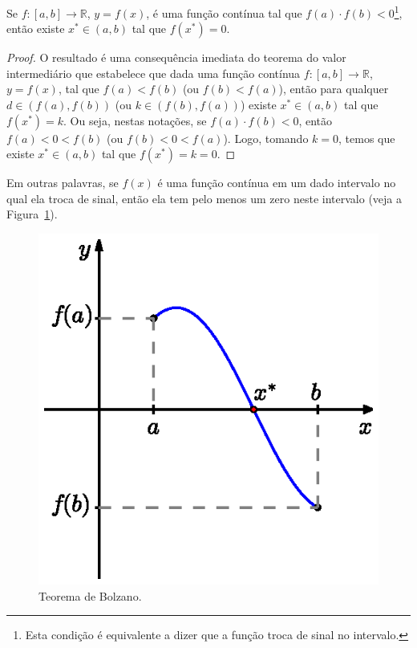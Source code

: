 \begin{teo}\label{teo:teorema_de_Bolzano}
  Se $f:[a, b]\to\mathbb{R}$, $y = f(x)$, é uma função contínua tal que $f(a)\cdot f(b) < 0$\footnote{Esta condição é equivalente a dizer que a função troca de sinal no intervalo.}, então existe $x^*\in (a, b)$ tal que $f(x^*) = 0$.
\end{teo}
\begin{proof}
  O resultado é uma consequência imediata do teorema do valor intermediário que estabelece que dada uma função contínua $f:[a, b]\to\mathbb{R}$, $y = f(x)$, tal que $f(a) < f(b)$ (ou $f(b) < f(a)$), então para qualquer $d\in \left(f(a), f(b)\right)$ (ou $k\in \left(f(b), f(a)\right)$) existe $x^*\in (a, b)$ tal que $f(x^*) = k$. Ou seja, nestas notações, se $f(a)\cdot f(b) < 0$, então $f(a) < 0 < f(b)$ (ou $f(b) < 0 < f(a)$). Logo, tomando $k = 0$, temos que existe $x^*\in (a, b)$ tal que $f(x^*) = k = 0$.
\end{proof}

Em outras palavras, se $f(x)$ é uma função contínua em um dado intervalo no qual ela troca de sinal, então ela tem pelo menos um zero neste intervalo (veja a Figura~\ref{fig:teorema_de_Bolzano}).

\begin{figure}
  \centering
  \includegraphics{./cap_equacao1d/pics/teorema_de_Bolzano/teorema_de_Bolzano.eps}
  \caption{Teorema de Bolzano.}
  \label{fig:teorema_de_Bolzano}
\end{figure}

